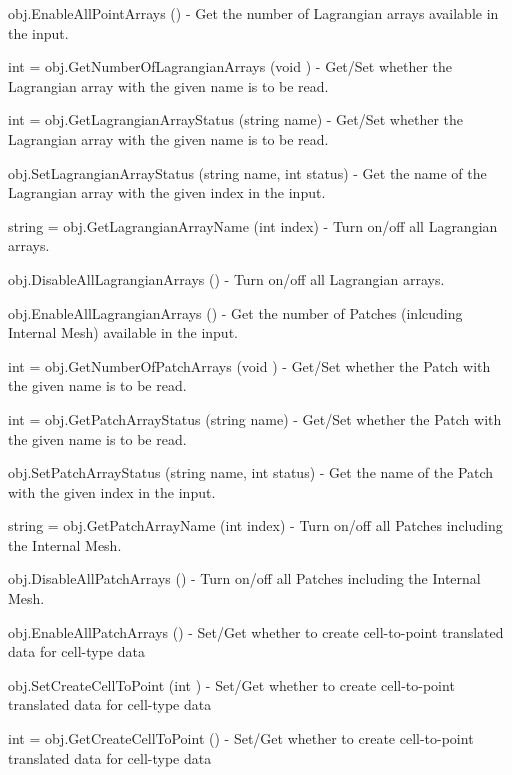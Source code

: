 \begin{DoxyItemize}
\item {\ttfamily obj.\-Enable\-All\-Point\-Arrays ()} -\/ Get the number of Lagrangian arrays available in the input.  
\item {\ttfamily int = obj.\-Get\-Number\-Of\-Lagrangian\-Arrays (void )} -\/ Get/\-Set whether the Lagrangian array with the given name is to be read.  
\item {\ttfamily int = obj.\-Get\-Lagrangian\-Array\-Status (string name)} -\/ Get/\-Set whether the Lagrangian array with the given name is to be read.  
\item {\ttfamily obj.\-Set\-Lagrangian\-Array\-Status (string name, int status)} -\/ Get the name of the Lagrangian array with the given index in the input.  
\item {\ttfamily string = obj.\-Get\-Lagrangian\-Array\-Name (int index)} -\/ Turn on/off all Lagrangian arrays.  
\item {\ttfamily obj.\-Disable\-All\-Lagrangian\-Arrays ()} -\/ Turn on/off all Lagrangian arrays.  
\item {\ttfamily obj.\-Enable\-All\-Lagrangian\-Arrays ()} -\/ Get the number of Patches (inlcuding Internal Mesh) available in the input.  
\item {\ttfamily int = obj.\-Get\-Number\-Of\-Patch\-Arrays (void )} -\/ Get/\-Set whether the Patch with the given name is to be read.  
\item {\ttfamily int = obj.\-Get\-Patch\-Array\-Status (string name)} -\/ Get/\-Set whether the Patch with the given name is to be read.  
\item {\ttfamily obj.\-Set\-Patch\-Array\-Status (string name, int status)} -\/ Get the name of the Patch with the given index in the input.  
\item {\ttfamily string = obj.\-Get\-Patch\-Array\-Name (int index)} -\/ Turn on/off all Patches including the Internal Mesh.  
\item {\ttfamily obj.\-Disable\-All\-Patch\-Arrays ()} -\/ Turn on/off all Patches including the Internal Mesh.  
\item {\ttfamily obj.\-Enable\-All\-Patch\-Arrays ()} -\/ Set/\-Get whether to create cell-\/to-\/point translated data for cell-\/type data  
\item {\ttfamily obj.\-Set\-Create\-Cell\-To\-Point (int )} -\/ Set/\-Get whether to create cell-\/to-\/point translated data for cell-\/type data  
\item {\ttfamily int = obj.\-Get\-Create\-Cell\-To\-Point ()} -\/ Set/\-Get whether to create cell-\/to-\/point translated data for cell-\/type data  

\end{DoxyItemize}
